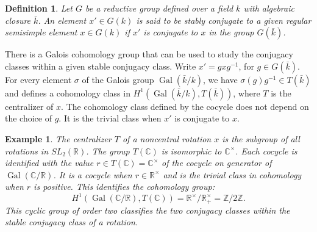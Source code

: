 \documentclass[brochure,english,12pt]{bourbaki}
\newtheorem{example}[equation]{Example}
\newtheorem{definition}[equation]{Definition}
\def\op#1{{\operatorname{#1}}}
\newcommand{\ring}[1]{\mathbb{#1}}
\begin{document}
\begin{definition} Let $G$ be a reductive group defined over a field
  $k$ with algebraic closure $\bar k$.  An element
  $x'\in G(k)$ is said to be {\it stably conjugate} to a given regular
  semisimple element $x\in G(k)$ if $x'$ is conjugate to $x$ in
  the group $G(\bar k)$.
\end{definition}


There is a Galois cohomology group that can be used to study the conjugacy classes within
a given stable conjugacy class.
Write $x'=gx g^{-1}$, for $g\in G(\bar k)$.
For every element $\sigma$ of the Galois group $\op{Gal}(\bar k/k)$,  we have
 $\sigma(g)g^{-1}\in T(\bar k)$ and defines a cohomology class in
$H^1(\op{Gal}(\bar k/k),T(\bar k))$, where $T$ is the centralizer of
$x$.  The cohomology class defined by the cocycle does not depend
on the choice of $g$.  It is the trivial class when
$x'$ is conjugate to $x$.


\begin{example} The centralizer $T$ of a noncentral rotation $x$ is  the subgroup of all
rotations in  $SL_2(\ring{R})$.  The group $T(\ring{C})$ is isomorphic
  to $\ring{C}^\times$.   Each cocycle is identified with the value $r\in T(\ring{C})=\ring{C}^\times$ 
   of the cocycle on generator of  $\op{Gal}(\ring{C}/\ring{R})$.  It is a cocycle when $r\in \ring{R}^\times$
  and is the trivial class in cohomology when $r$ is positive.  This identifies the cohomology group:
\[
H^1(\op{Gal}(\ring{C}/\ring{R}),T(\ring{C})) = \ring{R}^\times/\ring{R}^\times_+ = \ring{Z}/2\ring{Z}.
\]
 This cyclic group of order two classifies the two conjugacy classes within the stable conjugacy class
 of a rotation.
\end{example}
\end{document}
